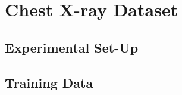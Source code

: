 \documentclass[12pt]{article}
\begin{document}




\section{Chest X-ray Dataset}

\subsection{Experimental Set-Up}



\subsection{Training Data}
\end{document}
